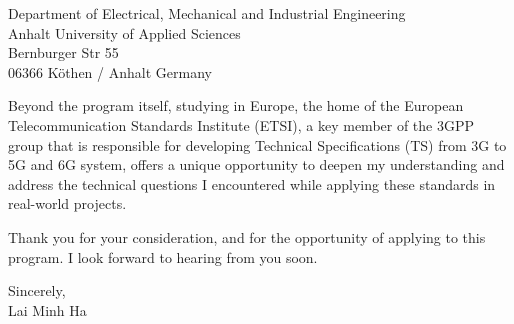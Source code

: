 \documentclass[a4paper,12pt]{letter}
\begin{document}
\begin{letter}{
    Department of Electrical, Mechanical and Industrial Engineering
    \\ Anhalt University of Applied Sciences
    \\ Bernburger Str 55 
    \\ 06366 Köthen / Anhalt Germany
}

Beyond the program itself, studying in Europe, the home of the European Telecommunication Standards Institute (ETSI), a key member of the 3GPP group that is responsible for developing Technical Specifications (TS) from 3G to 5G and 6G system, offers a unique opportunity to deepen my understanding and address the technical questions I encountered while applying these standards in real-world projects.

\vspace{1cm}
Thank you for your consideration, and for the opportunity of applying to this program. I look forward to hearing from you soon.


\begin{flushright}
    Sincerely,
    \\ Lai Minh Ha
\end{flushright}

\end{letter}
\end{document}

